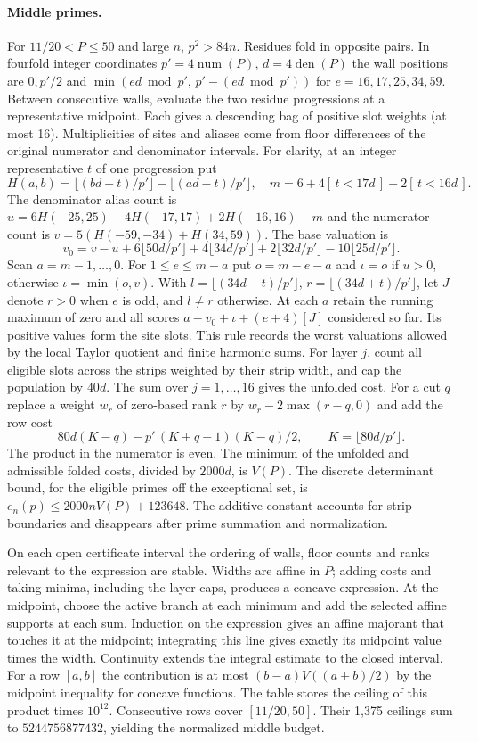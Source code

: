 \documentclass[11pt]{article}
\begin{document}
\paragraph{Middle primes.}
For $11/20<P\le50$ and large $n$, $p^2>84n$. Residues fold in opposite
pairs. In fourfold integer coordinates $p'=4\operatorname{num}(P)$,
$d=4\operatorname{den}(P)$ the wall positions are $0,p'/2$ and
$\min(ed\bmod p',\,p'-(ed\bmod p'))$ for $e=16,17,25,34,59$.
Between consecutive walls, evaluate the two residue progressions at a
representative midpoint. Each gives a descending bag of positive slot
weights (at most 16). Multiplicities of sites and aliases come from floor
differences of the original numerator and denominator intervals.
For clarity, at an integer representative $t$ of one progression put
\[
 H(a,b)=\lfloor(bd-t)/p'\rfloor-\lfloor(ad-t)/p'\rfloor,\quad
 m=6+4[\,t<17d\,]+2[\,t<16d\,].
\]
The denominator alias count is
$u=6H(-25,25)+4H(-17,17)+2H(-16,16)-m$ and the numerator count is
$v=5(H(-59,-34)+H(34,59))$. The base valuation is
\[
 v_0=v-u+6\lfloor50d/p'\rfloor+4\lfloor34d/p'\rfloor+
 2\lfloor32d/p'\rfloor-10\lfloor25d/p'\rfloor .
\]
Scan $a=m-1,\ldots,0$. For $1\le e\le m-a$ put $o=m-e-a$ and
$\iota=o$ if $u>0$, otherwise $\iota=\min(o,v)$. With
$l=\lfloor(34d-t)/p'\rfloor$, $r=\lfloor(34d+t)/p'\rfloor$, let $J$
denote $r>0$ when $e$ is odd, and $l\ne r$ otherwise. At each $a$ retain
the running maximum of zero and all scores
$a-v_0+\iota+(e+4)[J]$ considered so far. Its positive values form the
site slots. This rule records the worst valuations allowed by the local
Taylor quotient and finite harmonic sums.
For layer $j$, count all eligible slots across the strips weighted by
their strip width, and cap the population by $40d$. The sum over
$j=1,\ldots,16$ gives the unfolded cost. For a cut $q$ replace a weight
$w_r$ of zero-based rank $r$ by $w_r-2\max(r-q,0)$ and add the row cost
\[
 80d(K-q)-p'\,(K+q+1)(K-q)/2,\qquad K=\lfloor80d/p'\rfloor .
\]
The product in the numerator is even. The minimum of the unfolded
and admissible folded costs, divided by $2000d$, is $V(P)$.
The discrete determinant bound, for the eligible primes off the
exceptional set, is $e_n(p)\le2000nV(P)+123648$. The additive constant
accounts for strip boundaries and disappears after prime summation and
normalization.

On each open certificate interval the ordering of walls, floor counts
and ranks relevant to the expression are stable. Widths are affine in
$P$; adding costs and taking minima, including the layer caps, produces
a concave expression. At the midpoint, choose the active branch
at each minimum and add the selected affine supports at each sum.
Induction on the expression gives an affine majorant that touches it at
the midpoint; integrating this line gives exactly its midpoint value
times the width. Continuity extends the integral estimate to
the closed interval. For a row $[a,b]$ the contribution is at most
$(b-a)V((a+b)/2)$ by the midpoint inequality for concave functions.
The table stores the ceiling of this product times $10^{12}$.
Consecutive rows cover $[11/20,50]$. Their 1,375 ceilings sum to
$5244756877432$, yielding the normalized middle budget.
\end{document}
